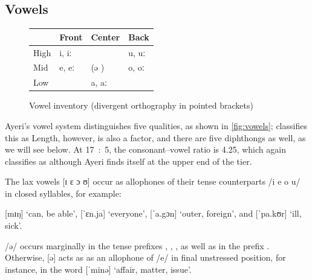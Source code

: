 %
%

\subsection{Vowels}
\label{subsec:vowels}

%
\begin{figure}[t]\centering
\caption[Vowel inventory]{Vowel inventory (divergent orthography in pointed brackets)}
\begin{tabu} to .67\linewidth{H[1] X[2c] X[2c] X[2c]}
\toprule\tableheaderfont

	& Front
	& Center
	& Back
	\\

\toprule

High
	& i, iː 
	&
	& u, uː 
	\\
	\midrule

Mid
	& e, eː 
	& (ə )
	& o, oː 
	\\
	\midrule

Low
	&
	& a, aː 
	&
	\\

\bottomrule
\end{tabu}
\label{fig:vowels}
\end{figure}

Ayeri's vowel system distinguishes five qualities, as shown in 
\autoref{fig:vowels}; \citet{wals2} classifies this as 
Length, however, is also a factor, and there are five diphthongs as well, as we 
will see below. At 17~:~5, the consonant--vowel ratio is 4.25, which 
\citet{wals3} again classifies as  although Ayeri finds 
itself at the upper end of the tier.

%
The lax vowels [ɪ ɛ ɔ ʊ] occur as allophones of their tense counterparts 
/i e o u/ in closed syllables, for example:

\pex
	\a {} [mɪŋ] `can, be able',
	\a {} [ˈɛn.ja] `everyone',
	\a {} [ˈa.gɔn] `outer, foreign', and
	\a {} [ˈpa.kʊr] `ill, sick'.
\xe

/ə/ occurs marginally in the tense prefixes , 
, , as well as in the prefix 
. Otherwise, [ə] acts as as an allophone of /e/ 
in final unstressed position, for instance, in the word 
 [ˈminə] `affair, matter, issue'.

